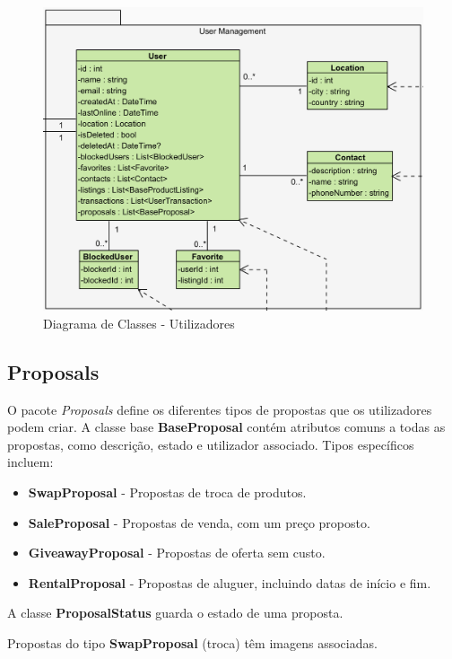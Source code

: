\documentclass[a4paper, 12pt]{article} %
\begin{document}
\begin{figure}[ht]
	\centering
	\includegraphics[width=\textwidth]{../images/class-diagram-user-management.png}
	\caption{Diagrama de Classes - Utilizadores}
	\label{fig:class_diagram_user_management}
\end{figure}

\subsection{Proposals}
O pacote \textit{Proposals} define os diferentes tipos de propostas que os utilizadores podem criar. A classe base \textbf{BaseProposal} contém atributos comuns a todas as propostas, como descrição, estado e utilizador associado. Tipos específicos incluem:
\begin{itemize}
	\item \textbf{SwapProposal} - Propostas de troca de produtos.
	\item \textbf{SaleProposal} - Propostas de venda, com um preço proposto.
	\item \textbf{GiveawayProposal} - Propostas de oferta sem custo.
	\item \textbf{RentalProposal} - Propostas de aluguer, incluindo datas de início e fim.
\end{itemize}
A classe \textbf{ProposalStatus} guarda o estado de uma proposta.

Propostas do tipo \textbf{SwapProposal} (troca) têm imagens associadas.
\end{document}
